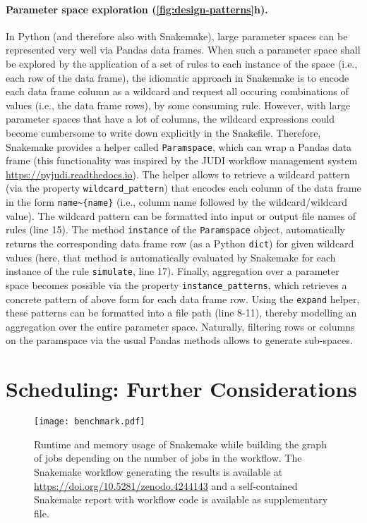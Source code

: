 \documentclass[10pt,a4paper,twocolumn]{article}
\let\plainurl\url
\renewcommand{\url}[1]{\protect\plainurl{#1}}
\begin{document}
\paragraph{Parameter space exploration (\autoref{fig:design-patterns}h).}
In Python (and therefore also with Snakemake), large parameter spaces can be represented very well via Pandas \parencite{reback2020pandas,mckinney-proc-scipy-2010} data frames.
When such a parameter space shall be explored by the application of a set of rules to each instance of the space (i.e., each row of the data frame), the idiomatic approach in Snakemake is to encode each data frame column as a wildcard and request all occuring combinations of values (i.e., the data frame rows), by some consuming rule.
However, with large parameter spaces that have a lot of columns, the wildcard expressions could become cumbersome to write down explicitly in the Snakefile.
Therefore, Snakemake provides a helper called \lstinline!Paramspace!, which can wrap a Pandas data frame (this functionality was inspired by the JUDI workflow management system \url{https://pyjudi.readthedocs.io}).
The helper allows to retrieve a wildcard pattern (via the property \lstinline!wildcard_pattern!) that encodes each column of the data frame in the form \lstinline!name~{name}! (i.e., column name followed by the wildcard/wildcard value).
The wildcard pattern can be formatted into input or output file names of rules (line 15).
The method \lstinline!instance! of the \lstinline!Paramspace! object, automatically returns the corresponding data frame row (as a Python \lstinline!dict!) for given wildcard values (here, that method is automatically evaluated by Snakemake for each instance of the rule \lstinline!simulate!, line 17).
Finally, aggregation over a parameter space becomes possible via the property \lstinline!instance_patterns!, which retrieves a concrete pattern of above form for each data frame row.
Using the \lstinline!expand! helper, these patterns can be formatted into a file path (line 8-11), thereby modelling an aggregation over the entire parameter space.
Naturally, filtering rows or columns on the paramspace via the usual Pandas methods allows to generate sub-spaces.



\section{Scheduling: Further Considerations}
\label{sec:morescheduling}

\begin{figure*}
 \centering
 \texttt{[image: benchmark.pdf]}
 \caption{Runtime and memory usage of Snakemake while building the graph of jobs depending on the number of jobs in the workflow. The Snakemake workflow generating the results is available at \url{https://doi.org/10.5281/zenodo.4244143} and a self-contained Snakemake report with workflow code is available as supplementary file.}\label{fig:benchmark}
\end{figure*}
\end{document}
